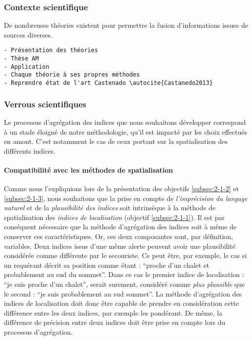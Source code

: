 \subsubsection{Contexte scientifique}

De nombreuses théories existent pour permettre la fusion
d'informations issues de sources diverses.

\begin{verbatim}
- Présentation des théories
- Thèse AM
- Application
- Chaque théorie à ses propres méthodes
- Reprendre état de l'art Castenado \autocite{Castanedo2013}
\end{verbatim}

\subsubsection{Verrous scientifiques}

Le processus d'agrégation des indices que nous souhaitons développer
correspond à un stade éloigné de notre méthodologie, \ie qu'il est
impacté par les choix effectués en amont. C'est notamment le cas de
ceux portant sur la spatialisation des différents indices.

\paragraph{Compatibilité avec les méthodes de spatialisation}

Comme nous l'expliquions lors de la présentation des objectifs
\ref{subsec:2-1-2} et \ref{subsec:2-1-3}, nous souhaitons que la prise
en compte de \emph{l'imprécision du langage naturel} et de la
\emph{plausibilité des indices} soit intrinsèque à la méthode de
spatialisation des \emph{indices de localisation} (objectif
\ref{subsec:2-1-1}). Il est par conséquent nécessaire que la méthode
d'agrégation des indices soit à même de conserver ces
caractéristiques.
% 
Or, ces deux composantes sont, par définition, variables. Deux indices
issus d'une même alerte peuvent avoir une plausibilité considérée
comme différente par le secouriste. Ce peut être, par exemple, le cas
si un requérant décrit sa position comme étant : \enquote{proche d'un
  chalet et probablement au sud du sommet}. Dans ce cas le premier
indice de localisation : \enquote{je suis proche d'un chalet}, serait
surement, considéré comme \emph{plus plausible} que le second :
\enquote{je suis probablement au sud sommet}. La méthode d'agrégation
des indices de localisation doit donc être capable de prendre en
considération cette différence entre les deux indices, par exemple les
pondérant. De même, la différence de précision entre deux indices doit
être prise en compte lors du processus d'agrégation.


